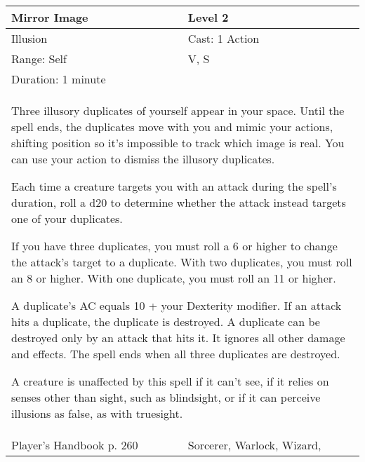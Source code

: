 \documentclass[11pt]{report}
\begin{document}
\begin{table}[H]
	\begin{tabular}{||p{6cm}|p{6cm}||}
		\hline\hline
		\bf{Mirror Image} & Level 2\\ \hline
		Illusion & Cast: 1 Action\\ \hline
		Range: Self & V, S\\ \hline
		Duration: 1 minute & \\ \hline
		\multicolumn{2}{||p{12cm}||}{Three illusory duplicates of yourself appear in your space.
Until the spell ends, the duplicates move with you and mimic your actions, shifting position so it’s impossible to track which image is real. You can use your action to dismiss the illusory duplicates.

Each time a creature targets you with an attack during the spell’s duration, roll a d20 to determine whether the attack instead targets one of your duplicates.

If you have three duplicates, you must roll a 6 or higher to change the attack’s target to a duplicate. With two duplicates, you must roll an 8 or higher. With one duplicate, you must roll an 11 or higher.

A duplicate’s AC equals 10 + your Dexterity modifier. If an attack hits a duplicate, the duplicate is destroyed. A duplicate can be destroyed only by an attack that hits it. It ignores all other damage and effects. The spell ends when all three duplicates are destroyed.

A creature is unaffected by this spell if it can’t see, if it relies on senses other than sight, such as blindsight, or if it can perceive illusions as false, as with truesight.}\\ \hline
Player's Handbook p. 260 & Sorcerer, Warlock, Wizard, \\ \hline\hline
	\end{tabular}
\end{table}
\end{document}

